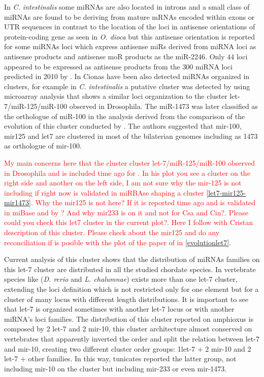 \documentclass[graybox]{svmult}
\begin{document}
In \textit{C. intestinalis} some miRNAs are also located in introns and a small 
class of miRNAs are found to be deriving from mature mRNAs encoded within exons 
or UTR sequences \cite{Hendrix2010} in contrast to the location of the  loci in 
antisense orientations of protein-coding gene as seen in \textit{O. dioca} but 
this antisense orientation is reported for some miRNAs loci which express 
antisense miRs derived from miRNA loci as antisense products and antisense moR 
products as the miR-2246. Only $44$ loci appeared to be expressed as antisense 
products from the $300$ miRNA loci predicted in 2010 by \cite{Hendrix2010}. In 
Cionas have been also detected miRNAs organized in clusters, for example in  
\textit{C. intestinalis} a putative cluster was detected by \cite{Keshavan2010} 
using microarray analysis that shows a similar loci organization to the cluster 
let-7/miR-125/miR-100 observed in Drosophila. The miR-1473 was later classified 
as the orthologue of miR-100 in the analysis derived from the comparison of the 
evolution of this cluster conducted by \cite{Griffiths-Jones2011}. The authors 
suggested that mir-100, mir125 and let7 are clustered in most of the bilaterian 
genomes including as 1473 as orthologue of mir-100. 

\textcolor{red}{My main concerns here that the cluster cluster 
let-7/miR-125/miR-100 observed in Drosophila and is included time ago for 
\cite{Griffiths-Jones2011}. In his plot you see a cluster on the right side 
and another on the left side, I am not sure why the mir-125 is not including 
if right now is validated in miRBAse shaping a cluster 
\ref{let7-mir125-mir1473}. Why the mir125 is not here? If it is reported time 
ago and is validated in miBase and by \cite{Keshavan2010}? And why mir233 is 
on it and not for Csa and Cin?. Please could you check this let7 cluster in 
the current plot?. Here I follow with Cristan description of this cluster. 
Please check about the mir125 and do any reconciliation if is posible with the 
plot of the paper of  \cite{Griffiths-Jones2011} in \ref{evolutionlet7}.}

Current analysis of this cluster shows that the distribution of miRNAs families 
on this let-7 cluster are distributed in all the studied chordate species. In 
vertebrate species like (\textit{D. rerio} and \textit{L. chalumnae}) exists 
more than one let-7 cluster, extending the loci definition which is not 
restricted only for one element but for a cluster of many locus with different 
length distributions. It is important to see that let-7 is organized sometimes 
with another let-7 locus or with another miRNA's loci families. The distribution 
of this cluster reported on amphioxus is composed by 2 let-7 and 2 mir-10, this 
cluster architecture almost conserved on vertebrates that apparently inverted 
the order and split the relation between let-7 and mir-10, creating two 
different cluster order groups: 1let-7 + 2 mir-10 and 2 let-7 + other families. 
In this way, tunicates reported the latter group, not including mir-10 on the 
cluster but including mir-233 or even mir-1473. 
\end{document}
